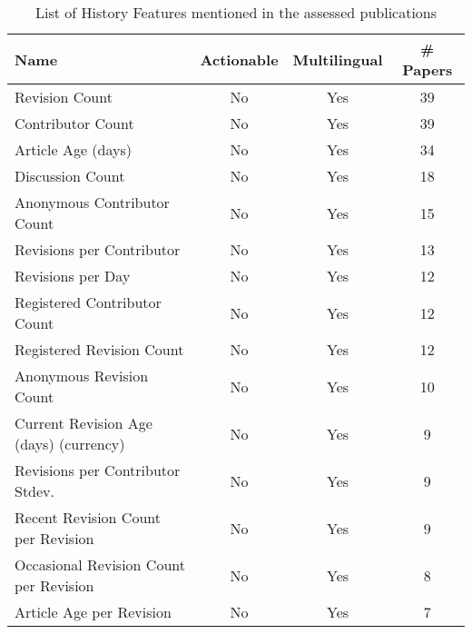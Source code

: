 \begin{table}[htbp]
    \caption{List of History Features mentioned in the assessed publications}
    \label{tab:feat_History}
    \centering
    \begin{tabular}{m{} c c c}
        \toprule
        \textbf{Name} & \textbf{Actionable} & \textbf{Multilingual} & \textbf{\# Papers} \\ 
        \midrule
        Revision Count & No & Yes & 39 \\
        Contributor Count & No & Yes & 39 \\
        Article Age (days) & No & Yes & 34 \\
        Discussion Count & No & Yes & 18 \\
        Anonymous Contributor Count & No & Yes & 15 \\
        Revisions per Contributor & No & Yes & 13 \\
        Revisions per Day & No & Yes & 12 \\
        Registered Contributor Count & No & Yes & 12 \\
        Registered Revision Count & No & Yes & 12 \\
        Anonymous Revision Count & No & Yes & 10 \\
        Current Revision Age (days) (currency) & No & Yes & 9 \\
        Revisions per Contributor Stdev. & No & Yes & 9 \\
        Recent Revision Count per Revision & No & Yes & 9 \\
        Occasional Revision Count per Revision  & No & Yes & 8 \\
        Article Age per Revision & No & Yes & 7 \\
        \bottomrule
    \end{tabular}
\end{table}